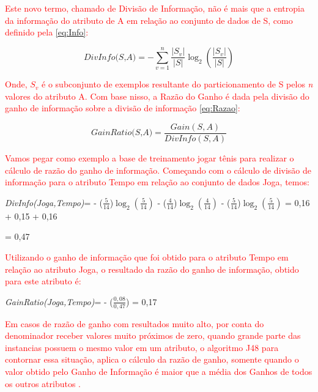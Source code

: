 \textcolor{red}{Este novo termo, chamado de Divisão de Informação, não é mais que a entropia da informação do atributo de A em relação ao conjunto de dados de S, como definido pela \autoref{eq:Info}:}

\begin{equation}
    \label{eq:Info}
        {\textit{DivInfo(S,A)}={ - \sum_{v=1}^{n} \frac{|S_v|}{|S|} \log_{2}(\frac{|S_v|}{|S|}) } }
\end{equation}

\par
\textcolor{red}{Onde, $S_v$ é o subconjunto de exemplos resultante do particionamento de S pelos \textit{n} valores do atributo A. Com base nisso, a Razão do Ganho é dada pela divisão do ganho de informação sobre a divisão de informação \autoref{eq:Razao}:}

\begin{equation}
    \label{eq:Razao}
        {\textit{GainRatio(S,A)}={ \frac{Gain(S,A)}{DivInfo(S,A)} } }
\end{equation}


\par
\textcolor{red}{Vamos pegar como exemplo a base de treinamento jogar tênis para realizar o cálculo de razão do ganho de informação. Começando com o cálculo de divisão de informação para o atributo Tempo em relação ao conjunto de dados Joga, temos:}

\textit{DivInfo(Joga,Tempo)}={ - ($\frac{5}{14}$)$\log_{2}(\frac{5}{14})$ - ($\frac{4}{14}$)$\log_{2}(\frac{4}{14})$ - ($\frac{5}{14}$)$\log_{2}(\frac{5}{14})$ = 0,16 + 0,15 + 0,16} 

= 0,47

\par
\textcolor{red}{Utilizando o ganho de informação que foi obtido para o atributo Tempo em relação ao atributo Joga, o resultado da razão do ganho de informação, obtido para este atributo é:}

\textit{GainRatio(Joga,Tempo)}={ - ($\frac{0,08}{0,47}$) = 0,17} 

\par
\textcolor{red}{Em casos de razão de ganho com resultados muito alto, por conta do denominador receber valores muito próximos de zero, quando grande parte das instancias possuem o mesmo valor em um atributo, o algoritmo J48 para contornar essa situação, aplica o cálculo da razão de ganho, somente quando o valor obtido pelo Ganho de Informação é maior que a média dos Ganhos de todos os outros atributos \cite{Carvalho2014}.}

